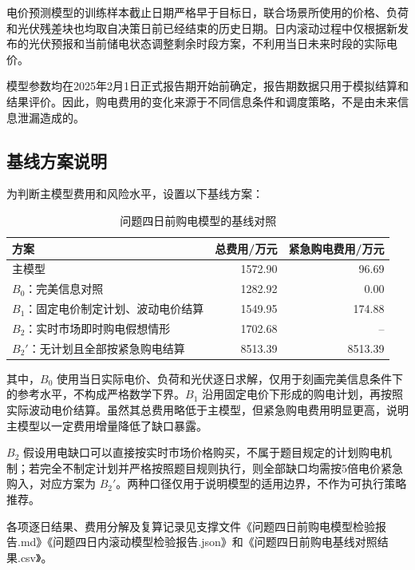 电价预测模型的训练样本截止日期严格早于目标日，联合场景所使用的价格、负荷和光伏残差块也均取自决策日前已经结束的历史日期。日内滚动过程中仅根据新发布的光伏预报和当前储电状态调整剩余时段方案，不利用当日未来时段的实际电价。

模型参数均在2025年2月1日正式报告期开始前确定，报告期数据只用于模拟结算和结果评价。因此，购电费用的变化来源于不同信息条件和调度策略，不是由未来信息泄漏造成的。

\subsection{基线方案说明}

为判断主模型费用和风险水平，设置以下基线方案：

\begin{table}[H]
    \centering
    \begin{tabular}{lrr}
        \toprule
        方案 & 总费用/万元 & 紧急购电费用/万元 \\
        \midrule
        主模型 & 1572.90 & 96.69 \\
        \(B_0\)：完美信息对照 & 1282.92 & 0.00 \\
        \(B_1\)：固定电价制定计划、波动电价结算 & 1549.95 & 174.88 \\
        \(B_2\)：实时市场即时购电假想情形 & 1702.68 & -- \\
        \(B_2'\)：无计划且全部按紧急购电结算 & 8513.39 & 8513.39 \\
        \bottomrule
    \end{tabular}
    \caption{问题四日前购电模型的基线对照}
    \label{tab:app_q4_baselines}
\end{table}

其中，\(B_0\) 使用当日实际电价、负荷和光伏逐日求解，仅用于刻画完美信息条件下的参考水平，不构成严格数学下界。\(B_1\) 沿用固定电价下形成的购电计划，再按照实际波动电价结算。虽然其总费用略低于主模型，但紧急购电费用明显更高，说明主模型以一定费用增量降低了缺口暴露。

\(B_2\) 假设用电缺口可以直接按实时市场价格购买，不属于题目规定的计划购电机制；若完全不制定计划并严格按照题目规则执行，则全部缺口均需按5倍电价紧急购入，对应方案为 \(B_2'\)。两种口径仅用于说明模型的适用边界，不作为可执行策略推荐。

各项逐日结果、费用分解及复算记录见支撑文件《问题四日前购电模型检验报告.md》《问题四日内滚动模型检验报告.json》和《问题四日前购电基线对照结果.csv》。